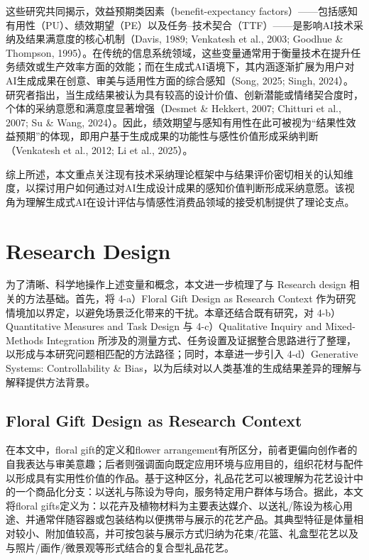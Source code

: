 这些研究共同揭示，效益预期类因素（benefit-expectancy factors）——包括感知有用性（PU）、绩效期望（PE）以及任务–技术契合（TTF）——是影响AI技术采纳及结果满意度的核心机制（Davis, 1989; Venkatesh et al., 2003; Goodhue \& Thompson, 1995）。在传统的信息系统领域，这些变量通常用于衡量技术在提升任务绩效或生产效率方面的效能；而在生成式AI语境下，其内涵逐渐扩展为用户对AI生成成果在创意、审美与适用性方面的综合感知（Song, 2025; Singh, 2024）。研究者指出，当生成结果被认为具有较高的设计价值、创新潜能或情绪契合度时，个体的采纳意愿和满意度显著增强（Desmet \& Hekkert, 2007; Chitturi et al., 2007; Su \& Wang, 2024）。因此，绩效期望与感知有用性在此可被视为“结果性效益预期”的体现，即用户基于生成成果的功能性与感性价值形成采纳判断（Venkatesh et al., 2012; Li et al., 2025）。

综上所述，本文重点关注现有技术采纳理论框架中与结果评价密切相关的认知维度，以探讨用户如何通过对AI生成设计成果的感知价值判断形成采纳意愿。该视角为理解生成式AI在设计评估与情感性消费品领域的接受机制提供了理论支点。

\section{Research Design}

为了清晰、科学地操作上述变量和概念，本文进一步梳理了与 Research design 相关的方法基础。首先，将 4-a）Floral Gift Design as Research Context 作为研究情境加以界定，以避免场景泛化带来的干扰。本章还结合既有研究，对 4-b）Quantitative Measures and Task Design 与 4-c）Qualitative Inquiry and Mixed-Methods Integration 所涉及的测量方式、任务设置及证据整合思路进行了整理，以形成与本研究问题相匹配的方法路径；同时，本章进一步引入 4-d）Generative Systems: Controllability \& Bias，以为后续对以人类基准的生成结果差异的理解与解释提供方法背景。

\subsection{Floral Gift Design as Research Context}

在本文中，floral gift的定义和flower arrangement有所区分，前者更偏向创作者的自我表达与审美意趣；后者则强调面向既定应用环境与应用目的，组织花材与配件以形成具有实用性价值的作品。基于这种区分，礼品花艺可以被理解为花艺设计中的一个商品化分支：以送礼与陈设为导向，服务特定用户群体与场合。据此，本文将floral gifts定义为：以花卉及植物材料为主要表达媒介、以送礼/陈设为核心用途、并通常伴随容器或包装结构以便携带与展示的花艺产品。其典型特征是体量相对较小、附加值较高，并可按包装与展示方式归纳为花束/花篮、礼盒型花艺以及与照片/画作/微景观等形式结合的复合型礼品花艺。

